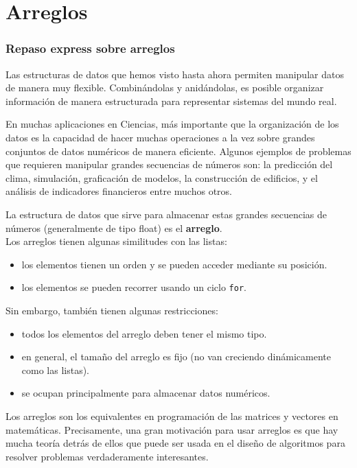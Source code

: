 \section{Arreglos}
\begin{frame}
\frametitle{Repaso express sobre arreglos}
Las estructuras de datos que hemos visto hasta ahora permiten manipular datos de manera muy flexible. Combin\'{a}ndolas y anid\'{a}ndolas, es posible organizar informaci\'{o}n de manera estructurada para representar sistemas del mundo real.
\end{frame}
\begin{frame}
En muchas aplicaciones en Ciencias, m\'{a}s importante que la organizaci\'{o}n de los datos es la capacidad de hacer muchas operaciones a la vez sobre grandes conjuntos de datos num\'{e}ricos de manera eficiente. Algunos ejemplos de problemas que requieren manipular grandes secuencias de n\'{u}meros son: la predicción del clima, simulaci\'{o}n, graficaci\'{o}n de modelos, la construcci\'{o}n de edificios, y el an\'{a}lisis de indicadores financieros entre muchos otros.
\end{frame}
\begin{frame}
La estructura de datos que sirve para almacenar estas grandes secuencias de n\'{u}meros (generalmente de tipo float) es el \textbf{arreglo}.
\\
\bigskip
Los arreglos tienen algunas similitudes con las listas:
\begin{itemize}
\item los elementos tienen un orden y se pueden acceder mediante su posici\'{o}n.
\item los elementos se pueden recorrer usando un ciclo \texttt{for}.
\end{itemize}
\end{frame}
\begin{frame}
Sin embargo, tambi\'{e}n tienen algunas restricciones:
\begin{itemize}
\item todos los elementos del arreglo deben tener el mismo tipo.
\item en general, el tamaño del arreglo es fijo (no van creciendo din\'{a}micamente como las listas).
\item se ocupan principalmente para almacenar datos num\'{e}ricos.
\end{itemize}
\end{frame}
\begin{frame}
Los arreglos son los equivalentes en programaci\'{o}n de las matrices y vectores en matem\'{a}ticas. Precisamente, una gran motivaci\'{o}n para usar arreglos es que hay mucha teor\'{i}a detr\'{a}s de ellos que puede ser usada en el diseño de algoritmos para resolver problemas verdaderamente interesantes.
\end{frame}
